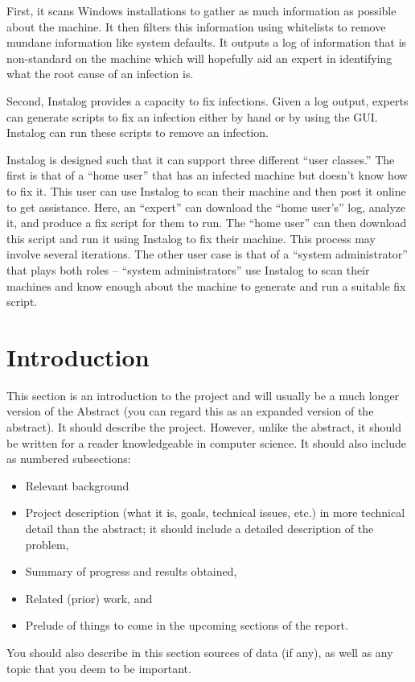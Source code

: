 \documentclass[letterpaper,12pt]{article}
\begin{document}
First, it scans Windows installations to gather as much information as possible
about the machine.  It then filters this information using whitelists to remove
mundane information like system defaults.  It outputs a log of information that
is non-standard on the machine which will hopefully aid an expert in identifying
what the root cause of an infection is.

Second, Instalog provides a capacity to fix infections.  Given a log output,
experts can generate scripts to fix an infection either by hand or by using the
GUI.  Instalog can run these scripts to remove an infection.  

Instalog is designed such that it can support three different ``user classes.'' 
The first is that of a ``home user'' that has an infected machine but doesn't
know how to fix it.  This user can use Instalog to scan their machine and then
post it online to get assistance.  Here, an ``expert'' can download the ``home
user's'' log, analyze it, and produce a fix script for them to run.  The ``home
user'' can then download this script and run it using Instalog to fix their
machine.  This process may involve several iterations.  The other user case is
that of a ``system administrator'' that plays both roles -- ``system
administrators'' use Instalog to scan their machines and know enough about the
machine to generate and run a suitable fix script.  

\newpage



\section{Introduction}
This section is an introduction to the project and will usually be a much longer
version of the Abstract (you can regard this as an expanded version of the
abstract). It should describe the project.
However, unlike the abstract, it should be written for a reader knowledgeable in
computer science. It should also include as numbered subsections:
\begin{itemize}
  \item Relevant background	
  \item Project description (what it is, goals, technical issues, etc.) in more
  technical detail than the abstract; it should include a detailed description of the problem, 
  \item Summary of progress and results obtained,
  \item Related (prior) work, and
  \item Prelude of things to come in the upcoming sections of the report. 
\end{itemize}
You should also describe in this section sources of data (if any), as well as
any topic that you deem to be important.
\newpage
\end{document}
